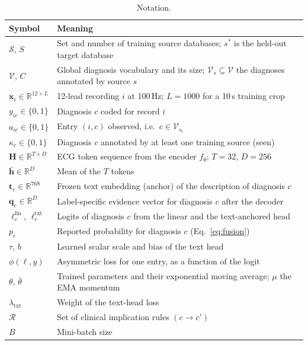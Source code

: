 \begin{table}[!htbp]
\centering\footnotesize
\caption{Notation.}\label{tab:notation}
\begin{tabularx}{\textwidth}{@{}l X@{}}
\toprule
Symbol & Meaning \\
\midrule
$\mathcal{S}$, $S$ & Set and number of training source databases; $s^\ast$ is the held-out target database \\
$\mathcal{V}$, $C$ & Global diagnosis vocabulary and its size; $\mathcal{V}_s\subseteq\mathcal{V}$ the diagnoses annotated by source $s$ \\
$\mathbf{x}_i\in\mathbb{R}^{12\times L}$ & 12-lead recording $i$ at 100\,Hz; $L=1000$ for a 10\,s training crop \\
$y_{ic}\in\{0,1\}$ & Diagnosis $c$ coded for record $i$ \\
$a_{ic}\in\{0,1\}$ & Entry $(i,c)$ observed, i.e.\ $c\in\mathcal{V}_{s_i}$ \\
$\kappa_c\in\{0,1\}$ & Diagnosis $c$ annotated by at least one training source (seen) \\
$\mathbf{H}\in\mathbb{R}^{T\times D}$ & ECG token sequence from the encoder $f_\theta$; $T=32$, $D=256$ \\
$\bar{\mathbf{h}}\in\mathbb{R}^{D}$ & Mean of the $T$ tokens \\
$\mathbf{t}_c\in\mathbb{R}^{768}$ & Frozen text embedding (anchor) of the description of diagnosis $c$ \\
$\mathbf{q}_c\in\mathbb{R}^{D}$ & Label-specific evidence vector for diagnosis $c$ after the decoder \\
$\ell^{\mathrm{lin}}_c$, $\ell^{\mathrm{txt}}_c$ & Logits of diagnosis $c$ from the linear and the text-anchored head \\
$p_c$ & Reported probability for diagnosis $c$ (Eq.~\eqref{eq:fusion}) \\
$\tau$, $b$ & Learned scalar scale and bias of the text head \\
$\phi(\ell,y)$ & Asymmetric loss for one entry, as a function of the logit \\
$\theta$, $\bar\theta$ & Trained parameters and their exponential moving average; $\mu$ the EMA momentum \\
$\lambda_{\mathrm{txt}}$ & Weight of the text-head loss \\
$\mathcal{R}$ & Set of clinical implication rules $(c\rightarrow c')$ \\
$B$ & Mini-batch size \\
\bottomrule
\end{tabularx}
\end{table}

